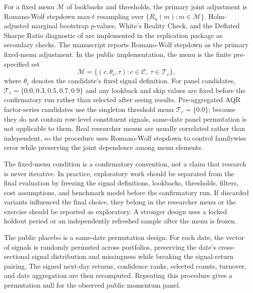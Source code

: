 \documentclass[12pt,a4paper]{article}
\begin{document}
For a fixed menu \(\mathcal M\) of lookbacks and thresholds, the primary
joint adjustment is Romano-Wolf stepdown max-\(t\) resampling over
\(\{R_u(m):m\in\mathcal M\}\).  Holm-adjusted marginal bootstrap
\(p\)-values, White's Reality Check, and the Deflated Sharpe Ratio
diagnostic of \citet{bailey2014probability} are implemented in the
replication package as secondary checks.  The manuscript reports
Romano-Wolf stepdown as the primary fixed-menu adjustment.
In the public implementation, the menu is the finite pre-specified set
\[
  \mathcal M=\{(c,\theta_c,\tau):c\in\mathcal C,\ \tau\in\mathcal T_c\},
\]
where \(\theta_c\) denotes the candidate's fixed signal definition.
For panel candidates, \(\mathcal T_c=\{0.0,0.3,0.5,0.7,0.9\}\) and
any lookback and skip values are fixed before the confirmatory run
rather than selected after seeing results.  Pre-aggregated AQR factor-series
candidates use the singleton threshold menu \(\mathcal T_c=\{0.0\}\);
because they do not contain row-level constituent signals, same-date
panel permutation is not applicable to them.
Real researcher menus are usually correlated rather than independent, so
the procedure uses Romano-Wolf stepdown to control familywise error while
preserving the joint dependence among menu elements.

The fixed-menu condition is a confirmatory convention, not a claim that
research is never iterative.  In practice, exploratory work should be
separated from the final evaluation by freezing the signal definitions,
lookbacks, thresholds, filters, cost assumptions, and benchmark model
before the confirmatory run.  If discarded variants influenced the final
choice, they belong in the researcher menu or the exercise should be
reported as exploratory.  A stronger design uses a locked holdout period
or an independently refreshed sample after the menu is frozen.

The public placebo is a same-date permutation design.  For each date,
the vector of signals is randomly permuted across portfolios, preserving
the date's cross-sectional signal distribution and missingness while
breaking the signal-return pairing.  The signed next-day returns,
confidence ranks, selected counts, turnover, and date aggregation are
then recomputed.  Repeating this procedure gives a permutation null for
the observed public momentum panel.
\end{document}
